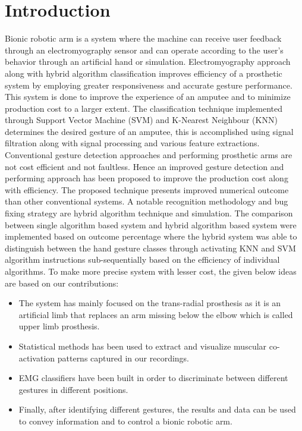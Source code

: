 \documentclass[conference]{IEEEtran}
\begin{document}
\section{Introduction}
Bionic robotic arm is a system where the machine can receive user feedback through an electromyography sensor and can operate according to the user's behavior through an artificial hand or simulation. Electromyography approach along with hybrid algorithm classification improves efficiency of a prosthetic system by employing greater responsiveness and accurate gesture performance. This system is done to improve the experience of an amputee and to minimize production cost to a larger extent. The classification technique implemented through Support Vector Machine (SVM) and K-Nearest Neighbour (KNN) determines the desired gesture of an amputee, this is accomplished using signal filtration along with signal processing and various feature extractions. Conventional gesture detection approaches and performing prosthetic arms are not cost efficient and not faultless. Hence an improved gesture detection and performing approach has been proposed to improve the production cost along with efficiency. The proposed technique presents improved numerical outcome than other conventional systems. A notable recognition methodology and bug fixing strategy are hybrid algorithm technique and simulation. The comparison between single algorithm based system and hybrid algorithm based system were implemented based on outcome percentage where the hybrid system was able to distinguish between the hand gesture classes through activating KNN and SVM algorithm instructions sub-sequentially based on the efficiency of individual algorithms. To make more precise system with lesser cost, the given below ideas are based on our contributions:
\begin{itemize}
   \item The system has mainly focused on the trans-radial prosthesis as it is an artificial limb that replaces an arm missing below the elbow which is called upper limb prosthesis.
   \item Statistical methods has been used to extract and visualize muscular co-activation patterns captured in our recordings. 
   \item EMG classifiers have been built in order to discriminate between different gestures in different positions.
   \item Finally, after identifying different gestures, the results and data can be used to convey information and to control a bionic robotic arm.
\end{itemize}
\end{document}
